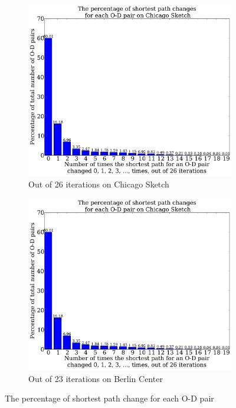 \begin{figure}[!ht]
    \centering
    \begin{subfigure}{.5\textwidth}
        \centering
        \includegraphics[page=1, width=\textwidth]{img/sp_change}
        \caption{Out of 26 iterations on Chicago Sketch}
        \label{fig:sp_change_chicago}
    \end{subfigure}%
    \begin{subfigure}{.5\textwidth}
        \centering
        \includegraphics[page=2, width=\textwidth]{img/sp_change}
        \caption{Out of 23 iterations on Berlin Center}
        \label{fig:sp_change_berlin}
    \end{subfigure}
        \caption{The percentage of shortest path change for each O-D pair}
        \label{fig:sp_change}
\end{figure}

